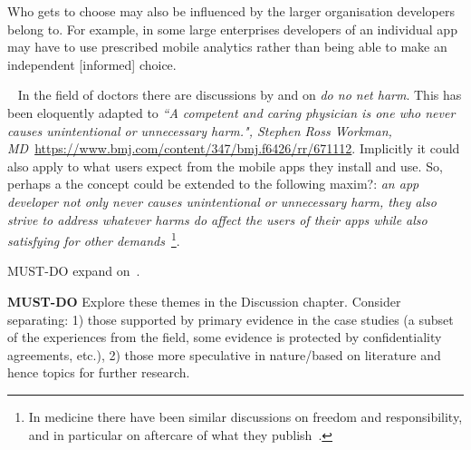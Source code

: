 Who gets to choose may also be influenced by the larger organisation developers belong to. For example, in some large enterprises developers of an individual app may have to use prescribed mobile analytics rather than being able to make an independent [informed] choice.


~\label{newthought-do-no-net-harm}
In the field of doctors there are discussions by \citealt{Schuenemann2011_guidelines2_0_do_no_net_harm} and \citealt{Sokolf6426_2013_first_do_no_harm_revisited} on \emph{do no net harm}. This has been eloquently adapted to \emph{``A competent and caring physician is one who never causes unintentional or unnecessary harm.", Stephen Ross Workman, MD}~\url{https://www.bmj.com/content/347/bmj.f6426/rr/671112}. Implicitly it could also apply to what users expect from the mobile apps they install and use. So, perhaps a the concept could be extended to the following maxim?: \emph{an app developer not only never causes unintentional or unnecessary harm, they also strive to address whatever harms do affect the users of their apps while also satisfying for other demands}~\footnote{In medicine there have been similar discussions on freedom and responsibility, and in particular on aftercare of what they publish~\citep{rennie1998_freedom_and_responsibility_in_medical_publication}.}.

MUST-DO expand on~\citep{shklovski2014_leakiness_and_creepiness_in_app_space_perceptions_of_privacy_and_mobile_app_use, zhou2017_user_perceived_control_trust_etc_smartphone}.

\textbf{MUST-DO} Explore these themes in the Discussion chapter. Consider separating: 1) those supported by primary evidence in the case studies (a subset of the experiences from the field, some evidence is protected by confidentiality agreements, etc.), 2) those more speculative in nature/based on literature and hence topics for further research.


\clearpage
